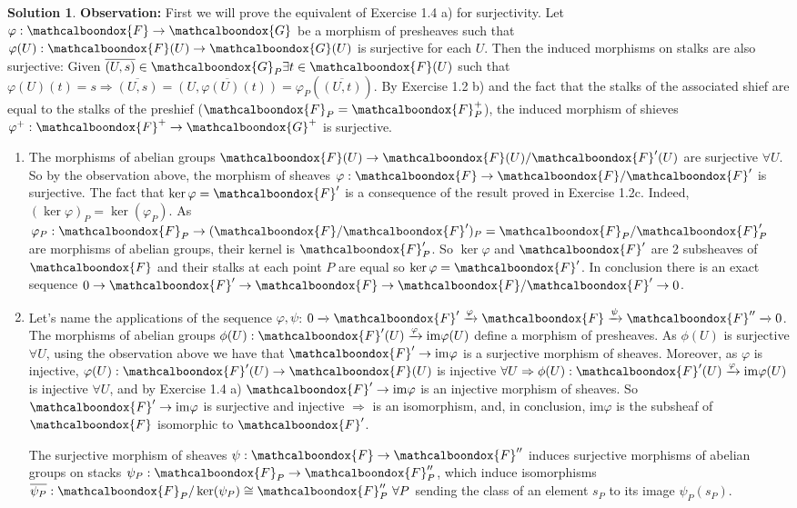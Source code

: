 \documentclass[12pt]{article}
\newcommand{\imp}{\ensuremath{\Rightarrow}}
\newcommand{\ima}{\ensuremath{\mathrm{im}}}
\theoremstyle{definition}
\newtheorem*{sol}{Solution}
\newcommand{\sF}{\ensuremath{\mathcalboondox{F}}}
\newcommand{\sG}{\ensuremath{\mathcalboondox{G}}}
\begin{document}
\begin{sol}
	\textbf{Observation:} First we will prove the equivalent of Exercise 1.4 a) for surjectivity. Let $\varphi: \sF \to \sG$ be a morphism of presheaves such that $\varphi(U): \sF(U) \to \sG(U)$ is surjective for each $U$. Then the induced morphisms on stalks are also surjective: Given $\overline{(U,s)} \in \sG_P \exists t \in \sF(U)$ such that $\varphi(U)(t) = s \imp \overline{(U,s)} = \overline{(U, \varphi(U)(t))} = \varphi_P(\overline{(U,t)})$. By Exercise 1.2 b) and the fact that the stalks of the associated shief are equal to the stalks of the preshief ($\sF_P = \sF^{+}_P$), the induced morphism of shieves $\varphi^{+}: \sF^{+} \to \sG^{+}$ is surjective.
	\begin{enumerate}[label=\alph*)]
		\item The morphisms of abelian groups $\sF(U) \to \sF(U)/\sF'(U)$ are surjective $\forall U$. So by the observation above, the morphism of sheaves $\varphi: \sF \to \sF/\sF'$ is surjective. The fact that $\ker \varphi = \sF'$ is a consequence of the result proved in Exercise 1.2c. Indeed, $(\ker \varphi)_P = \ker (\varphi_P)$. As $\varphi_P: \sF_P \to (\sF/\sF')_P = \sF_P/\sF'_P$ are morphisms of abelian groups, their kernel is $\sF'_P$. So $\ker \varphi$ and $\sF'$ are 2 subsheaves of $\sF$ and their stalks at each point $P$ are equal so $\ker \varphi = \sF'$. In conclusion there is an exact sequence $0 \to \sF' \to \sF \to \sF / \sF' \to 0$.

		\item Let's name the applications of the sequence $\varphi, \psi$: $0 \xrightarrow[]{} \sF' \xrightarrow[]{\varphi} \sF \xrightarrow[]{\psi} \sF'' \xrightarrow[]{} 0$. The morphisms of abelian groups $\phi(U): \sF'(U) \xrightarrow[]{\varphi} \ima\varphi(U)$ define a morphism of presheaves. As $\phi(U)$ is surjective $\forall U$, using the observation above we have that $\sF' \to \ima \varphi$ is a surjective morphism of sheaves. Moreover, as $\varphi$ is injective, $\varphi(U): \sF'(U) \to \sF(U)$ is injective $\forall U \imp \phi(U): \sF'(U) \xrightarrow[]{\varphi} \ima \varphi(U)$ is injective $\forall U$, and by Exercise 1.4 a) $\sF' \to \ima \varphi$ is an injective morphism of sheaves. So $\sF' \to \ima \varphi$ is surjective and injective $\imp$ is an isomorphism, and, in conclusion, $\ima \varphi$ is the subsheaf of $\sF$ isomorphic to $\sF'$.

		The surjective morphism of sheaves $\psi: \sF \to \sF''$ induces surjective morphisms of abelian groups on stacks $\psi_P: \sF_P \to \sF''_P$, which induce isomorphisms $\overline{\psi_P}: \sF_P/\ker(\psi_P) \cong \sF''_P \, \, \forall P$ sending the class of an element $s_P$ to its image $\psi_P(s_P)$. 


\end{enumerate}
\end{sol}
\end{document}
